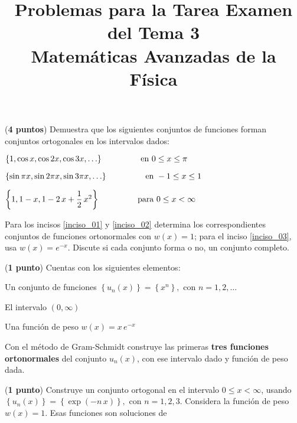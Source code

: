 
\title{Problemas para  la Tarea Examen del Tema 3 \\ \large{Matemáticas Avanzadas de la Física}\vspace{-8ex}}
\date{ }

\vspace{-4cm}
\renewcommand\labelenumii{\theenumi.{\arabic{enumii}}}
\maketitle
\fontsize{14}{14}\selectfont
\begin{milista}
\item (\textbf{4 puntos}) Demuestra que los siguientes conjuntos de funciones forman conjuntos ortogonales en los intervalos dados:
\begin{milista}
\item $\left\{ 1, \cos x, \cos 2 x, \cos 3 x, \ldots\right\}  \hspace{1.5cm} \mbox{ en } 0 \leq x \leq \pi$\label{inciso_01}
\item $\left\{ \sin \pi x, \sin 2 \pi x, \sin 3 \pi x, \ldots \right\} \hspace{1.5cm} \mbox{ en } -1 \leq x \leq 1$\label{inciso_02}
\item $\left\{ 1, 1 - x, 1 - 2 \, x + \dfrac{1}{2} \, x^{2} \right\} \hspace{1.5cm} \mbox{ para } 0 \leq x < \infty$\label{inciso_03}
\item Para los incisos \ref{inciso_01} y \ref{inciso_02} determina los correspondientes conjuntos de funciones ortonormales con $w(x) = 1$; para el inciso \ref{inciso_03}, usa $w(x) = e^{-x}$. Discute si cada conjunto forma o no, un conjunto completo.
\end{milista}
\item (\textbf{1 punto}) Cuentas con los siguientes elementos:
\begin{milista}
\item Un conjunto de funciones $\left\{ u_{n} (x) \right\} = \left\{ x^{n} \right\}, \mbox{ con } n = 1, 2, \ldots$
\item El intervalo $(0, \infty)$
\item Una función de peso $w(x) = x \, e^{-x}$
\end{milista}
Con el método de Gram-Schmidt construye las primeras \textbf{tres funciones ortonormales} del conjunto $u_{n}(x)$, con ese intervalo dado y función de peso dada.
\item (\textbf{1 punto}) Construye un conjunto ortogonal en el intervalo $0 \leq x < \infty$, usando $\left\{ u_{n}(x) \right\} = \left\{ \exp(-n \, x) \right\}, \mbox{ con } n = 1, 2, 3$. Considera la función de peso $w(x) = 1$. Esas funciones son soluciones de

\end{milista}
